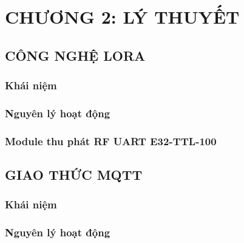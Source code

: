 \section*{CHƯƠNG 2: LÝ THUYẾT}
\setcounter{section}{2}
\setcounter{subsection}{0}
\subsection{CÔNG NGHỆ LORA}
\subsubsection{Khái niệm}
\subsubsection{Nguyên lý hoạt động}
\subsubsection{Module thu phát RF UART E32-TTL-100}

\subsection{GIAO THỨC MQTT}
\subsubsection{Khái niệm}
\subsubsection{Nguyên lý hoạt động}
